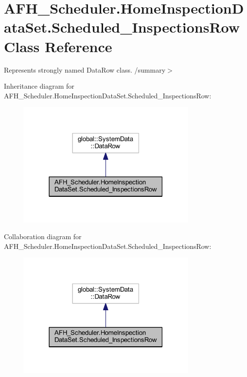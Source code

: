 \section{A\+F\+H\+\_\+\+Scheduler.\+Home\+Inspection\+Data\+Set.\+Scheduled\+\_\+\+Inspections\+Row Class Reference}
\label{class_a_f_h___scheduler_1_1_home_inspection_data_set_1_1_scheduled___inspections_row}


Represents strongly named Data\+Row class. /summary$>$  




Inheritance diagram for A\+F\+H\+\_\+\+Scheduler.\+Home\+Inspection\+Data\+Set.\+Scheduled\+\_\+\+Inspections\+Row\+:
\nopagebreak
\begin{figure}[H]
\begin{center}
\leavevmode
\includegraphics[width=254pt]{class_a_f_h___scheduler_1_1_home_inspection_data_set_1_1_scheduled___inspections_row__inherit__graph}
\end{center}
\end{figure}


Collaboration diagram for A\+F\+H\+\_\+\+Scheduler.\+Home\+Inspection\+Data\+Set.\+Scheduled\+\_\+\+Inspections\+Row\+:
\nopagebreak
\begin{figure}[H]
\begin{center}
\leavevmode
\includegraphics[width=254pt]{class_a_f_h___scheduler_1_1_home_inspection_data_set_1_1_scheduled___inspections_row__coll__graph}
\end{center}
\end{figure}
